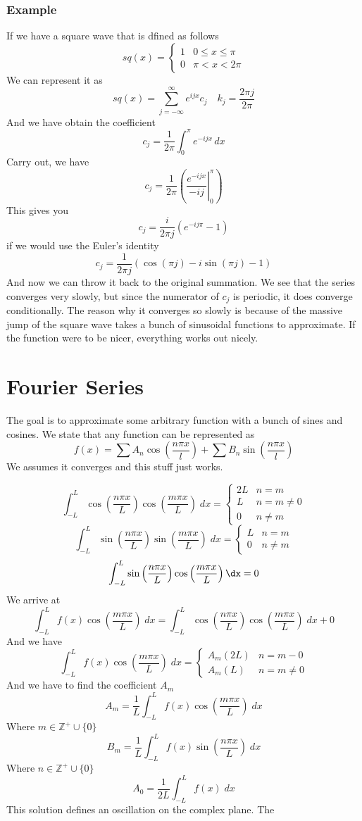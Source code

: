 \documentclass[12pt]{book}
\newcommand{\Z}{\mathbb{Z}}
\newcommand{\paren}[1]{\left( #1 \right)}
\newcommand{\nonneg}{\Z^+ \cup \{0\}}
\begin{document}
\subsubsection{Example}
If we have a square wave that is dfined as follows
\[
sq(x) = \begin{cases}
    1 & 0\leq x\leq \pi\\
    0 & \pi < x < 2\pi
\end{cases}
\]
We can represent it as
\[
sq(x) = \sum_{j=-\infty}^\infty e^{ijx}c_j \quad k_j = \frac{2\pi j}{2\pi}
\]
And we have obtain the coefficient
\[
c_j = \frac{1}{2\pi}\int_0^\pi e^{-ijx}\,dx
\]
Carry out, we have
\[
c_j = \frac{1}{2\pi}\paren{\left. \frac{e^{-ijx}}{-ij}\right|_0^\pi}
\]
This gives you 
\[
c_j = \frac{i}{2\pi j}\paren{e^{-ij\pi}-1}
\]
if we would use the Euler's identity
\[
c_j = \frac{1}{2\pi j }\paren{\cos\paren{\pi j} - i\sin\paren{\pi j} - 1}
\]
And now we can throw it back to the original summation. We see that the series converges very slowly, but since the numerator of $c_j$ is periodic, it does converge conditionally. The reason why it converges so slowly is because of the massive jump of the square wave takes a bunch of sinusoidal functions to approximate. If the function were to be nicer, everything works out nicely. 


\section{Fourier Series}
The goal is to approximate some arbitrary function with a bunch of sines and cosines. We state that any function can be represented as
\[
f(x) = \sum A_n\cos\paren{\frac{n\pi x}{l}} + \sum B_n\sin\paren{\frac{n\pi x}{l}}
\]
We assumes it converges and this stuff just works. 

\[
\int_{-L}^{L} \cos\paren{\frac{n\pi x}{L}}\cos\paren{\frac{m\pi x}{L}} \; dx = \begin{cases}
    2L & n=m\\
    L & n = m\neq 0\\
    0 & n\neq m
\end{cases}
\]
\[
\int_{-L}^{L} \sin\paren{\frac{n\pi x}{L}}\sin\paren{\frac{m\pi x}{L}} \;dx = \begin{cases}
    L & n = m\\
    0 & n\neq m
\end{cases}
\]
\[
\int_{-L}^{L} \sin\paren{\frac{n\pi x}{L}}\cos\paren{\frac{m\pi x}{L}} \dx =  0
\]
We arrive at
\[
\int_{-L}^{L} f(x) \cos\paren{\frac{m\pi x}{L}}\; dx = \int_{-L}^{L} \cos\paren{\frac{n\pi x}{L}}\cos\paren{\frac{m\pi x}{L}} \; dx + 0
\]
And we have
\[
\int_{-L}^{L} f(x) \cos\paren{\frac{m\pi x}{L}}\; dx = \begin{cases}
    A_m(2L) & n=m-0\\
    A_m(L) & n=m\neq 0
\end{cases}
\]
And we have to find the coefficient $A_m$
\[
A_m = \frac{1}{L}\int_{-L}^{L}f(x)\cos\paren{\frac{m\pi x}{L}} \; dx 
\]
Where $m\in\nonneg$
\[
B_m = \frac{1}{L}\int_{-L}^{L}f(x)\sin\paren{\frac{n\pi x}{L}} \; dx 
\]
Where $n \in \nonneg$
\[
A_0 = \frac{1}{2L}\int_{-L}^{L} f(x) \; dx 
\]
This solution defines an oscillation on the complex plane. The
\end{document}
